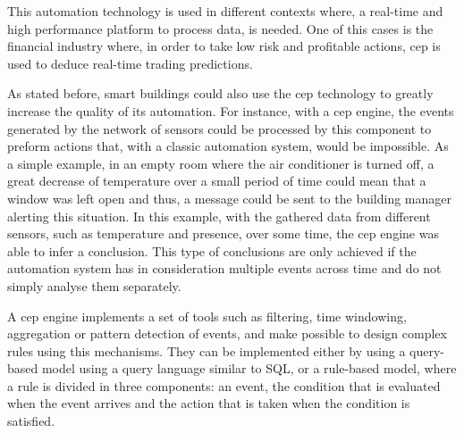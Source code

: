 This automation technology is used in different contexts where, a real-time and high performance platform to process data, is needed. One of this cases is the financial industry where, in order to take low risk and profitable actions, \ac{cep} is used to deduce real-time trading predictions.


As stated before, smart buildings could also use the \ac{cep} technology to greatly increase the quality of its automation. For instance, with a \ac{cep} engine, the events generated by the network of sensors could be processed by this component to preform actions that, with a classic automation system, would be impossible. As a simple example, in an empty room where the air conditioner is turned off, a great decrease of temperature over a small period of time could mean that a window was left open and thus, a message could be sent to the building manager alerting this situation. In this example, with the gathered data from different sensors, such as temperature and presence, over some time, the \acf{cep} engine was able to infer a conclusion. This type of conclusions are only achieved if the automation system has in consideration multiple events across time and do not simply analyse them separately.

A \ac{cep} engine implements a set of tools such as filtering, time windowing, aggregation or pattern detection of events, and make possible to design complex rules using this mechanisms. They can be implemented either by using a query-based model using a query language similar to SQL, or a rule-based model, where a rule is divided in three components: an event, the condition that is evaluated when the event arrives and the action that is taken when the condition is satisfied.



